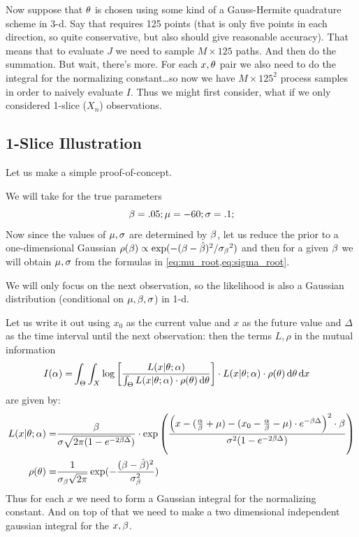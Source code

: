 Now suppose that ${ \theta}$ is chosen using some kind of a Gauss-Hermite quadrature
scheme in 3-d. Say that requires 125 points (that is only five points in each
direction, so quite conservative, but also should give reasonable accuracy).
That means that to evaluate $J$ we need to sample $M \times 125$ paths. And then do
the summation. But wait, there's more. For each $x,{ \theta}$ pair we also need to do
the integral for the normalizing constant\ldots so now we have $M \times 125^2$
process samples in order to naively evaluate $I$. 
Thus we might first consider, what if we only considered 1-slice ($X_n$)
observations.

\subsection{1-Slice Illustration}
Let us make a simple proof-of-concept.

We will take for the true parameters
$$
\beta = .05; {\mu } = -60; \sigma = .1;
$$
Now since the values of ${\mu }, \sigma$ are determined by $\beta$, let us reduce the prior
to a one-dimensional Gaussian
$\rho(\beta) \propto \exp( -(\beta -\hat {\beta})^2 / {\sigma_\beta}^2) $
and then for a given $\beta$ we will obtain ${\mu }, \sigma$ from
the formulas in \cref{eq:mu_root,eq:sigma_root}.

We will only focus on the next observation, so the likelihood is also a Gaussian
distribution (conditional on ${\mu },\beta,\sigma$) in 1-d. 

Let us write it out using $x_0$ as the current value and $x$ as the future
value and $\Delta$ as the time interval until the next observation:
then the terms $L,\rho$ in the mutual information
\begin{align*}
I(\alpha) =& \int_\Theta \int_X  \log\left[\frac{L(x|{ \theta}; \alpha)}
										{\int_\Theta L(x|{ \theta};\alpha)\cdot \rho({ \theta}) \, \mathrm{d} { \theta}} \right] \cdot L(x|
										{ \theta};\alpha) \cdot \rho({ \theta}) \, \mathrm{d} { \theta} \, \mathrm{d} x
										\end{align*}
										are given by:
\begin{align*}
L(x|{ \theta}; \alpha) =& \frac{\beta}{\sigma \sqrt{2\pi(1 -  e^{-2\beta \Delta}})}
 	\cdot \exp\left(\frac{\left( x - (\frac {\alpha}{\beta} + \mu)  - (x_{0} - \frac {\alpha}{\beta}
 	- \mu) \cdot e^{-\beta \Delta} \right)^2 \cdot \beta} { \sigma^2  (1-e^{-2\beta\Delta})}
 	\right) 
 	\\
 	\rho({ \theta}) =&  
 	\frac{1}{\sigma_\beta \sqrt{2\pi} } \exp(-\frac{(\beta-\hat{\beta})^2}{\sigma_\beta^2}) 
		\end{align*}
Thus for each $x$ we need to form a Gaussian integral for the normalizing
constant. And on top of that we need to make a two dimensional independent
gaussian integral for the $x,\beta$.

